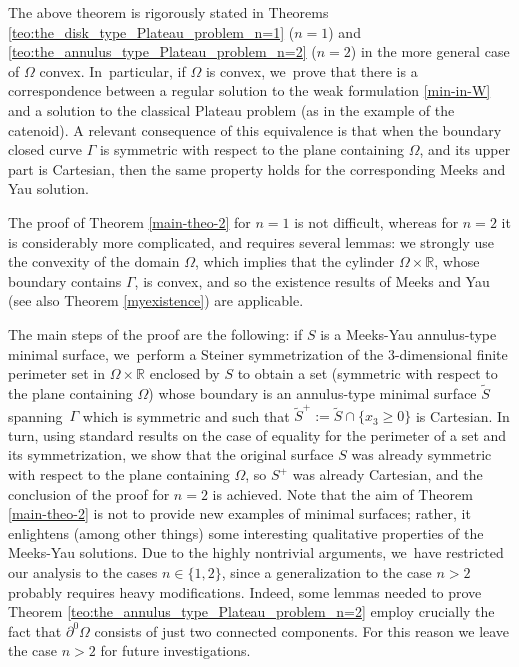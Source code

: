 \documentclass[JEP,XML,SOM,Unicode, NoFloatCountersInSection,published]{cedram}
\newcommand{\R}{\mathbb{R}}
\let\Om\Omega
\theoremstyle{definition}
\begin{document}
The above theorem is rigorously stated in Theorems \ref{teo:the_disk_type_Plateau_problem_n=1} ($n=1$) and \ref{teo:the_annulus_type_Plateau_problem_n=2} ($n=2$) in the more general case of $\Om$ convex. In~particular, if $\Om$ is convex, we~prove that there is a correspondence between a regular solution to the weak formulation \eqref{min-in-W} and a solution to the classical Plateau problem (as in the example of the catenoid).
A relevant consequence of this equivalence is
that when the boundary closed curve $\Gamma$ is symmetric with respect to the plane containing $\Om$, and its
upper part
is Cartesian, then the same property holds for the corresponding
Meeks and Yau solution.

The proof of Theorem \ref{main-theo-2} for $n=1$ is not difficult,
whereas for $n=2$ it is considerably more complicated,
and requires several lemmas:
we strongly use the convexity of the domain $\Omega$,
which implies that the cylinder $\Omega\times \R$, whose boundary contains $\Gamma$, is convex, and so the existence results of Meeks and Yau \cite{MY} (see also Theorem \ref{myexistence}) are applicable.

The main steps of the proof are the following: if $S$ is a Meeks-Yau annulus-type minimal surface, we~perform a Steiner symmetrization of the $3$-dimensional finite perimeter set in $\Omega\times\R$ enclosed by $S$ to obtain a set (symmetric with respect to the plane containing $\Om$) whose boundary is an annulus-type minimal surface $\widetilde S$ spanning~$\Gamma$ which is symmetric and such that $\widetilde S^+:=\widetilde S\cap\{x_3\ge0\}$ is Cartesian.
In turn, using standard results on the case
of equality for the perimeter of a set and its symmetrization, we
show that the original surface $S$
was already symmetric with respect to the plane containing $\Omega$, so $S^+$ was already Cartesian, and the conclusion of the proof for $n=2$ is achieved. Note that the aim of Theorem \ref{main-theo-2}
is not to provide new examples of minimal surfaces; rather, it enlightens
(among other things) some interesting qualitative properties of the Meeks-Yau
solutions.
Due to the highly nontrivial arguments, we~have restricted our analysis to the cases $n\in\{1,2\}$, since a generalization to the case $n>2$ probably requires heavy modifications.
Indeed, some lemmas needed to prove Theorem \ref{teo:the_annulus_type_Plateau_problem_n=2} employ crucially the fact that $\partial^0\Om$ consists of just two connected components.
For this reason we leave the case $n>2$ for future investigations.
\end{document}
